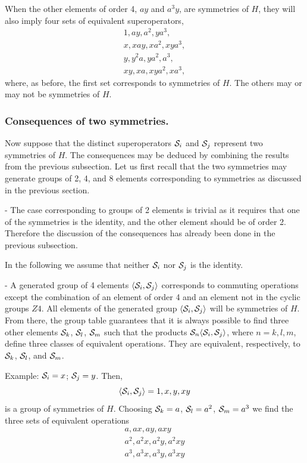 {When the  other elements of order 4, $ay$ and $a^3y$, are symmetries of $H$, they will also imply four sets of equivalent
superoperators,
%
\begin{eqnarray}
1,ay,a^2,ya^3,
\\
x,xay,xa^2,xya^3,
\\
y,y^2a,ya^2,a^3,
\\
xy,xa,xya^2,xa^3,
\end{eqnarray}
%
where, as before, the first set corresponds to symmetries of $H$. The others may or may not  be  symmetries of $H$.

\subsubsection{Consequences of two symmetries.}
%
Now suppose that the distinct superoperators  ${\cal S}_{i}$  and ${\cal S}_{j}$ represent two symmetries of $H$.
The consequences may be deduced by combining the results from the previous subsection.
Let us first recall that the two symmetries may generate groups of 2, 4, and 8 elements corresponding to symmetries as
discussed in the previous section.


- The case corresponding to groups of 2 elements is trivial as it requires that one of the symmetries
is the identity, and the other element should be of order 2.
Therefore the discussion of the consequences has already been done in the previous subsection.


In the following we assume that neither ${\cal S}_{i}$ nor ${\cal S}_{j}$ is the identity.



- A generated group of 4 elements $\langle {\cal S}_{i},{\cal S}_{j}\rangle$ corresponds to commuting operations except the combination of an element of order
4 and an element not in the cyclic groups $Z4$.  All elements of the generated group $\langle {\cal S}_{i},{\cal S}_{j}\rangle$ will be symmetries of $H$.
From there, the group table guarantees that it is always possible to find three other elements ${\cal S}_k$, ${\cal S}_l$, ${\cal S}_m$ such that the products
${\cal S}_{n}\langle {\cal S}_{i},{\cal S}_{j}\rangle$, where $n=k,l,m$, define three classes of equivalent operations. They are equivalent, respectively, to ${\cal S}_k$, ${\cal S}_l$, and ${\cal S}_m$.

Example:  ${\cal S}_{i}=x$;   ${\cal S}_{j}=y$. Then,
%
\begin{equation}
\langle {\cal S}_{i},{\cal S}_{j}\rangle=1,x,y,xy
\end{equation}
%
is a group of symmetries of $H$.
Choosing ${\cal S}_k=a$, ${\cal S}_l=a^2$, ${\cal S}_m=a^3$ we find  the three sets of equivalent operations
%
\begin{eqnarray}
a, ax, ay, axy
\nonumber\\
a^2,a^2x,a^2y,a^2xy
\nonumber\\
a^3,a^3x,a^3y,a^3xy
\end{eqnarray}
%


}
